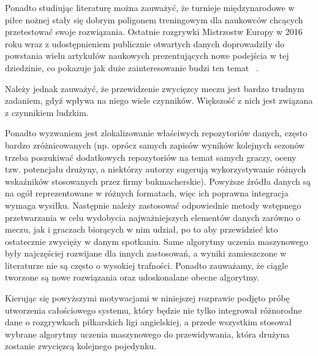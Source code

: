 Ponadto studiując literaturę można zauważyć, że turnieje międzynarodowe w piłce nożnej stały się dobrym poligonem treningowym  dla naukowców chcących przetestować swoje rozwiązania. Ostatnie rozgrywki Mistrzostw Europy w 2016 roku wraz z udostępnieniem publicznie otwartych danych doprowadziły do powstania wielu artykułów naukowych  prezentujących nowe podejścia w tej dziedzinie, co pokazuje jak duże zainteresowanie budzi ten temat~\cite{Euro2016-1} \cite{Euro2016-2} \cite{Euro2016-3}.

Należy jednak zauważyć, że przewidzenie zwycięzcy meczu jest bardzo trudnym zadaniem, gdyż wpływa na niego wiele czynników. Większość z nich jest związana z czynnikiem ludzkim. 

Ponadto wyzwaniem jest zlokalizowanie właściwych repozytoriów danych, często bardzo zróżnicowanych (np. oprócz samych zapisów wyników kolejnych sezonów trzeba poszukiwać dodatkowych repozytoriów na temat samych graczy, oceny tzw. potencjału drużyny, a niektórzy autorzy sugerują wykorzystywanie różnych wskaźników stosowanych przez firmy bukmacherskie). Powyższe źródła danych są na ogół reprezentowane w różnych formatach, więc ich poprawna integracja wymaga wysiłku. Następnie należy zastosować odpowiednie metody wstępnego przetwarzania  w celu wydobycia najważniejszych elementów danych zarówno o meczu, jak i graczach biorących w nim udział, po to aby przewidzieć kto ostatecznie zwycięży w danym spotkaniu. Same algorytmy uczenia maszynowego były najczęściej rozwijane dla innych zastosowań, a wyniki zamieszczone w literaturze nie są często o wysokiej trafności. Ponadto zauważamy, że ciągle tworzone są nowe rozwiązania oraz udoskonalane obecne algorytmy. 

Kierując się powyższymi motywacjami w niniejszej rozprawie podjęto próbę utworzenia całościowego systemu, który będzie nie tylko integrował różnorodne dane o rozgrywkach piłkarskich ligi angielskiej, a przede wszystkim stosował wybrane algorytmy uczenia maszynowego do przewidywania, która drużyna zostanie zwycięzcą kolejnego pojedynku. 

